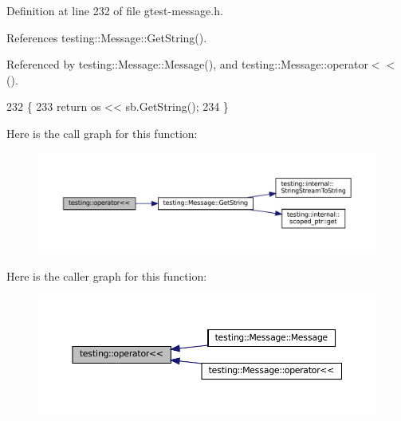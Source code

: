 Definition at line 232 of file gtest-\/message.\+h.



References testing\+::\+Message\+::\+Get\+String().



Referenced by testing\+::\+Message\+::\+Message(), and testing\+::\+Message\+::operator$<$$<$().


\begin{DoxyCode}
232                                                                   \{
233   \textcolor{keywordflow}{return} os << sb.GetString();
234 \}
\end{DoxyCode}
Here is the call graph for this function\+:
\nopagebreak
\begin{figure}[H]
\begin{center}
\leavevmode
\includegraphics[width=350pt]{namespacetesting_a7b802e532fd68749765cb7dc156130db_cgraph}
\end{center}
\end{figure}
Here is the caller graph for this function\+:
\nopagebreak
\begin{figure}[H]
\begin{center}
\leavevmode
\includegraphics[width=350pt]{namespacetesting_a7b802e532fd68749765cb7dc156130db_icgraph}
\end{center}
\end{figure}
\mbox{\label{namespacetesting_ac7520de8af26d3085513eeeb68561889}} 
